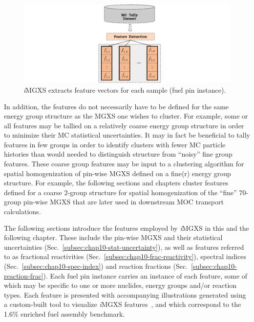 \begin{figure}[h!]
\centering
\includegraphics[width=0.9\linewidth]{figures/unsupervised/features/engineering/extract}
\vspace{2mm}
\caption[\textit{i}MGXS sample feature extraction]{\textit{i}\ac{MGXS} extracts feature vectors for each sample (fuel pin instance).}
\label{fig:chap10-feature-extract}
\end{figure}

In addition, the features do not necessarily have to be defined for the same energy group structure as the \ac{MGXS} one wishes to cluster. For example, some or all features may be tallied on a relatively coarse energy group structure in order to minimize their \ac{MC} statistical uncertainties. It may in fact be beneficial to tally features in few groups in order to identify clusters with fewer \ac{MC} particle histories than would needed to distinguish structure from ``noisy'' fine group features.
These coarse group features may be input to a clustering algorithm for spatial homogenization of pin-wise \ac{MGXS} defined on a fine(r) energy group structure. For example, the following sections and chapters cluster features defined for a coarse 2-group structure for spatial homogenization of the ``fine'' 70-group pin-wise \ac{MGXS} that are later used in downstream \ac{MOC} transport calculations.

The following sections introduce the features employed by \textit{i}\ac{MGXS} in this and the following chapter. These include the pin-wise \ac{MGXS} and their statistical uncertainties (Sec.~\ref{subsec:chap10-stat-uncertainty}), as well as features referred to as fractional reactivities (Sec.~\ref{subsec:chap10-frac-reactivity}), spectral indices (Sec.~\ref{subsec:chap10-spec-index}) and reaction fractions (Sec.~\ref{subsec:chap10-reaction-frac}). Each fuel pin instance carries an instance of each feature, some of which may be specific to one or more nuclides, energy groups and/or reaction types. Each feature is presented with accompanying illustrations generated using a custom-built tool to visualize \textit{i}\ac{MGXS} features~\cite{abel2016bokeh}, and which correspond to the 1.6\% enriched fuel assembly benchmark.

